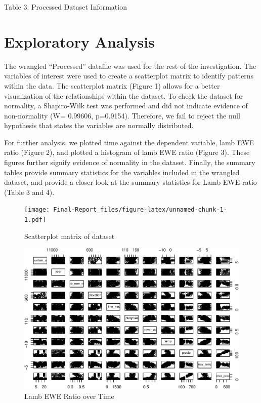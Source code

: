 \documentclass[
  12pt,
]{article}
\begin{document}
Table 3: Processed Dataset Information

\newpage

\hypertarget{exploratory-analysis}{%
\section{Exploratory Analysis}\label{exploratory-analysis}}

The wrangled ``Processed'' datafile was used for the rest of the
investigation. The variables of interest were used to create a
scatterplot matrix to identify patterns within the data. The scatterplot
matrix (Figure 1) allows for a better visualization of the relationships
within the dataset. To check the dataset for normality, a Shapiro-Wilk
test was performed and did not indicate evidence of non-normality (W=
0.99606, p=0.9154). Therefore, we fail to reject the null hypothesis
that states the variables are normally distributed.

For further analysis, we plotted time against the dependent variable,
lamb EWE ratio (Figure 2), and plotted a histogram of lamb EWE ratio
(Figure 3). These figures further signify evidence of normality in the
dataset. Finally, the summary tables provide summary statistics for the
variables included in the wrangled dataset, and provide a closer look at
the summary statistics for Lamb EWE ratio (Table 3 and 4).

\begin{figure}
\centering
\texttt{[image: Final-Report\_files/figure-latex/unnamed-chunk-1-1.pdf]}
\caption{Scatterplot matrix of dataset}
\end{figure}

\begin{figure}
\centering
\includegraphics{Final-Report_files/figure-latex/unnamed-chunk-2-1.pdf}
\caption{Lamb EWE Ratio over Time}
\end{figure}
\end{document}
